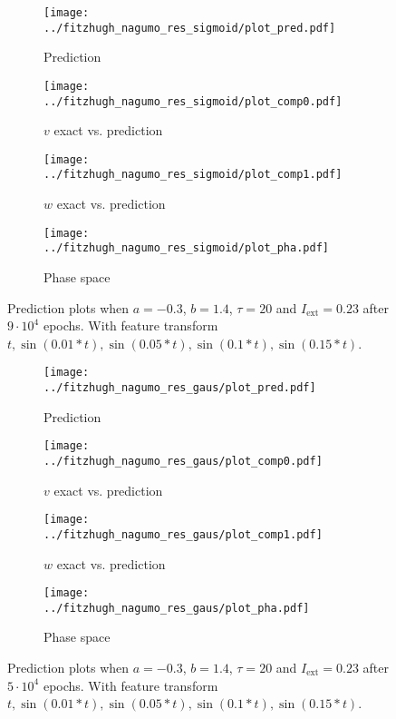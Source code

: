 \documentclass[a4paper]{article}
\begin{document}
\begin{figure}[H]
	\centering 
	\begin{subfigure}[b]{0.47\textwidth}
		\centering
		\texttt{[image: ../fitzhugh\_nagumo\_res\_sigmoid/plot\_pred.pdf]}
		\caption{Prediction}
		\label{fig:all03a}
	\end{subfigure}
	\begin{subfigure}[b]{0.47\textwidth}
		\centering
		\texttt{[image: ../fitzhugh\_nagumo\_res\_sigmoid/plot\_comp0.pdf]}
		\caption{$v$ exact vs. prediction}
		\label{fig:all03b}
	\end{subfigure}
	\begin{subfigure}[b]{0.47\textwidth}
		\centering
		\texttt{[image: ../fitzhugh\_nagumo\_res\_sigmoid/plot\_comp1.pdf]}
		\caption{$w$ exact vs. prediction}
		\label{fig:all03c}
	\end{subfigure}
	\begin{subfigure}[b]{0.47\textwidth}
		\centering
		\texttt{[image: ../fitzhugh\_nagumo\_res\_sigmoid/plot\_pha.pdf]}
		\caption{Phase space}
		\label{fig:all03d}
	\end{subfigure}
	\caption{Prediction plots when $a=-0.3$, $b=1.4$, $\tau=20$ and $ I_{\text{ext}}=0.23$ after $9\cdot10^4$ epochs. With feature transform $t, \sin(0.01 * t), \sin(0.05 * t), \sin(0.1 * t), \sin(0.15 * t)$.}
	\label{plot:all03}
\end{figure} 	


\begin{figure}[H]
	\centering 
	\begin{subfigure}[b]{0.47\textwidth}
		\centering
		\texttt{[image: ../fitzhugh\_nagumo\_res\_gaus/plot\_pred.pdf]}
		\caption{Prediction}
		\label{fig:all04a}
	\end{subfigure}
	\begin{subfigure}[b]{0.47\textwidth}
		\centering
		\texttt{[image: ../fitzhugh\_nagumo\_res\_gaus/plot\_comp0.pdf]}
		\caption{$v$ exact vs. prediction}
		\label{fig:all04b}
	\end{subfigure}
	\begin{subfigure}[b]{0.47\textwidth}
		\centering
		\texttt{[image: ../fitzhugh\_nagumo\_res\_gaus/plot\_comp1.pdf]}
		\caption{$w$ exact vs. prediction}
		\label{fig:all04c}
	\end{subfigure}
	\begin{subfigure}[b]{0.47\textwidth}
		\centering
		\texttt{[image: ../fitzhugh\_nagumo\_res\_gaus/plot\_pha.pdf]}
		\caption{Phase space}
		\label{fig:all04d}
	\end{subfigure}
	\caption{Prediction plots when $a=-0.3$, $b=1.4$, $\tau=20$ and $ I_{\text{ext}}=0.23$ after $5\cdot10^4$ epochs. With feature transform $t, \sin(0.01 * t), \sin(0.05 * t), \sin(0.1 * t), \sin(0.15 * t)$.}
	\label{plot:all04}
\end{figure}
\end{document}

